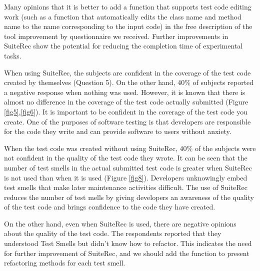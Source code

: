 \documentclass[conference]{IEEEtran}
\begin{document}
Many opinions that it is better to add a function that supports test code editing work (such as a function that automatically edits the class name and method name to the name corresponding to the input code) in the free description of the tool improvement by questionnaire we received. Further improvements in SuiteRec show the potential for reducing the completion time of experimental tasks.

When using SuiteRec, the subjects are confident in the coverage of the test code created by themselves (Question 5). On the other hand, 40\% of subjects reported a negative response when nothing was used. However, it is known that there is almost no difference in the coverage of the test code actually submitted (Figure \ref{fig5},\ref{fig6}). It is important to be confident in the coverage of the test code you create. One of the purposes of software testing is that developers are responsible for the code they write and can provide software to users without anxiety.

When the test code was created without using SuiteRec, 40\% of the subjects were not confident in the quality of the test code they wrote. It can be seen that the number of test smells in the actual submitted test code is greater when SuiteRec is not used than when it is used (Figure \ref{fig8}). Developers unknowingly embed test smells that make later maintenance activities difficult. The use of SuiteRec reduces the number of test mells by giving developers an awareness of the quality of the test code and brings confidence to the code they have created.

On the other hand, even when SuiteRec is used, there are negative opinions about the quality of the test code. The respondents reported that they understood Test Smells but didn't know how to refactor. This indicates the need for further improvement of SuiteRec, and we should add the function to present refactoring methods for each test smell.

\end{document}
